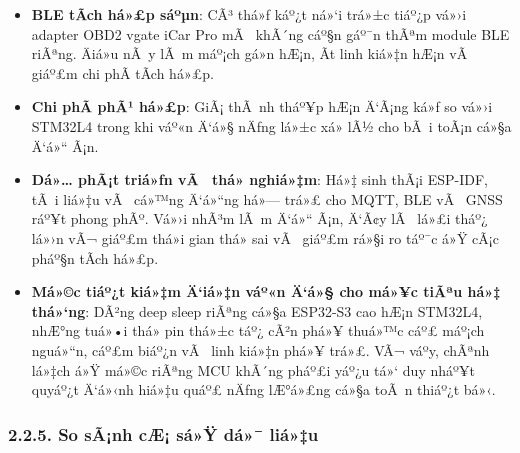 \documentclass[a4paper]{extarticle}
\providecommand{\tightlist}{%
  \setlength{\itemsep}{0pt}\setlength{\parskip}{0pt}}
\begin{document}
\begin{itemize}
\tightlist
\item
  \textbf{BLE tÃ­ch há»£p sáºµn}: CÃ³ thá»ƒ káº¿t ná»‘i trá»±c tiáº¿p vá»›i adapter OBD2
  vgate iCar Pro mÃ  khÃ´ng cáº§n gáº¯n thÃªm module BLE riÃªng. Äiá»u nÃ y lÃ m
  máº¡ch gá»n hÆ¡n, Ã­t linh kiá»‡n hÆ¡n vÃ  giáº£m chi phÃ­ tÃ­ch há»£p.
\item
  \textbf{Chi phÃ­ phÃ¹ há»£p}: GiÃ¡ thÃ nh tháº¥p hÆ¡n Ä‘Ã¡ng ká»ƒ so vá»›i STM32L4
  trong khi váº«n Ä‘á»§ nÄƒng lá»±c xá»­ lÃ½ cho bÃ i toÃ¡n cá»§a Ä‘á»“ Ã¡n.
\item
  \textbf{Dá»… phÃ¡t triá»ƒn vÃ  thá»­ nghiá»‡m}: Há»‡ sinh thÃ¡i ESP-IDF, tÃ i liá»‡u
  vÃ  cá»™ng Ä‘á»“ng há»— trá»£ cho MQTT, BLE vÃ  GNSS ráº¥t phong phÃº. Vá»›i nhÃ³m lÃ m
  Ä‘á»“ Ã¡n, Ä‘Ã¢y lÃ  lá»£i tháº¿ lá»›n vÃ¬ giáº£m thá»i gian thá»­ sai vÃ  giáº£m rá»§i ro táº¯c
  á»Ÿ cÃ¡c pháº§n tÃ­ch há»£p.
\item
  \textbf{Má»©c tiáº¿t kiá»‡m Ä‘iá»‡n váº«n Ä‘á»§ cho má»¥c tiÃªu há»‡ thá»‘ng}: DÃ²ng deep
  sleep riÃªng cá»§a ESP32-S3 cao hÆ¡n STM32L4, nhÆ°ng tuá»•i thá» pin thá»±c táº¿
  cÃ²n phá»¥ thuá»™c cáº£ máº¡ch nguá»“n, cáº£m biáº¿n vÃ  linh kiá»‡n phá»¥ trá»£. VÃ¬ váº­y,
  chÃªnh lá»‡ch á»Ÿ má»©c riÃªng MCU khÃ´ng pháº£i yáº¿u tá»‘ duy nháº¥t quyáº¿t Ä‘á»‹nh hiá»‡u
  quáº£ nÄƒng lÆ°á»£ng cá»§a toÃ n thiáº¿t bá»‹.
\end{itemize}

\subsubsection{2.2.5. So sÃ¡nh cÆ¡ sá»Ÿ dá»¯
liá»‡u}\label{225-so-suxe1nh-cux1a1-sux1edf-dux1eef-liux1ec7u}
\end{document}
